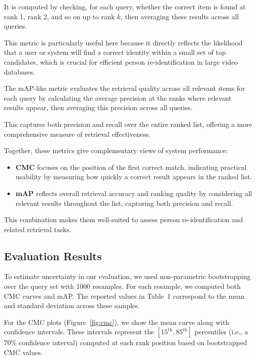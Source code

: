 \documentclass[fleqn,moreauthors,10pt]{ds_report}
\begin{document}
It is computed by checking, for each query, whether the correct item is found at rank 1, 
rank 2, and so on up to rank $k$, then averaging these results across all queries.

This metric is particularly useful here because it directly reflects 
the likelihood that a user or system will find a correct identity 
within a small set of top candidates, which is crucial for efficient person re-identification 
in large video databases.

The mAP-like metric evaluates the retrieval quality 
across all relevant items for each query by calculating the average precision 
at the ranks where relevant results appear, then averaging this precision across all queries.

This captures both precision and recall over the entire ranked list, 
offering a more comprehensive measure of retrieval effectiveness.

Together, these metrics give complementary views of system performance:

\begin{itemize}
    \item \textbf{CMC} focuses on the position of the first correct match, indicating practical usability by measuring how quickly a correct result appears in the ranked list.
    \item \textbf{mAP} reflects overall retrieval accuracy and ranking quality by considering all relevant results throughout the list, capturing both precision and recall.
\end{itemize}

This combination makes them well-suited to assess person re-identification and related retrieval tasks.

\subsection*{Evaluation Results}
To estimate uncertainty in our evaluation, we used non-parametric bootstrapping over the query set with 1000 resamples. 
For each resample, we computed both CMC curves and mAP. 
The reported values in Table~1 correspond to the mean and standard deviation across these samples.

For the CMC plots (Figure~\ref{fig:cmc}), we show the mean curve along with confidence intervals.
These intervals represent the $[15^\text{th}, 85^\text{th}]$ percentiles (i.e., a 70\% confidence interval)
computed at each rank position based on bootstrapped CMC values.
\end{document}
